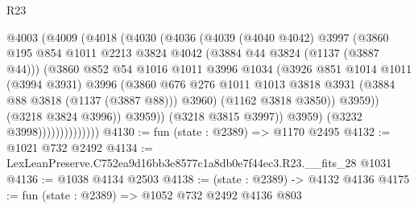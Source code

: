 \begin{lexlean}{R23}
\begin{coremodule}
                            @4003
                              (@4009
                                (@4018
                                  (@4030
                                    (@4036
                                      (@4039
                                        (@4040 @4042)
                                        @3997
                                        (@3860
                                          @195
                                          @854
                                          @1011
                                          @2213
                                          @3824
                                          @4042
                                          (@3884 @44 @3824 (@1137 (@3887 @44)))
                                          (@3860
                                            @852
                                            @54
                                            @1016
                                            @1011
                                            @3996
                                            @1034
                                            (@3926
                                              @851
                                              @1014
                                              @1011
                                              (@3994 @3931)
                                              @3996
                                              (@3860
                                                @676
                                                @276
                                                @1011
                                                @1013
                                                @3818
                                                @3931
                                                (@3884 @88 @3818 (@1137 (@3887 @88)))
                                                @3960)
                                              (@1162 @3818 @3850))
                                            @3959))
                                        (@3218 @3824 @3996))
                                      @3959))
                                  (@3218 @3815 @3997))
                                @3959)
                              (@3232 @3998))))))))))))))
@4130 := fun (state : @2389) => @1170 @2495
@4132 := @1021 @732 @2492
@4134 := LexLeanPreserve.C752ea9d16bb3e8577c1a8db0e7f44ec3.R23.__fits_28 @1031
@4136 := @1038 @4134 @2503
@4138 := (state : @2389) -> @4132 @4136
@4175 := fun (state : @2389) =>
  @1052
    @732
    @2492
    @4136
    @803

\end{coremodule}
\end{lexlean}
